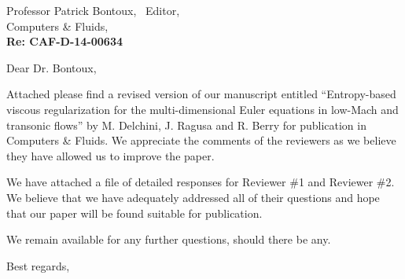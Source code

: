 
        \addtolength{\topmargin}{-2.5cm}    %
       \addtolength{\textheight}{5cm}    %

\address{Dr. Jean Ragusa \\
Nuclear Engineering Dept.\\
Texas A\&M University\\
College Station, TX
 \vspace{0.5cm}}


\signature{Marc Delchini, Jean Ragusa, and Ray Berry}




\begin{letter}{Professor Patrick Bontoux, \  Editor,\\
    Computers \& Fluids,\\
\textbf{Re: CAF-D-14-00634}}


\date{\today}

\opening{Dear Dr. Bontoux,}
         \vspace{0.25cm}

Attached please find a revised version of our manuscript entitled
``Entropy-based viscous regularization for the multi-dimensional Euler equations in low-Mach and transonic flows''
by M. Delchini, J. Ragusa and R. Berry for
publication in Computers \& Fluids. We appreciate the comments of the reviewers as we
believe they have allowed us to improve the paper.

We have attached a file of detailed responses for Reviewer \#1 and Reviewer \#2.
We believe that we have adequately addressed all of their questions and hope that our paper will be found suitable for publication.

%
%
\bigskip

We remain available for any further questions, should there be any.
\vspace{0.25cm}



\closing{Best regards, }

\end{letter}



